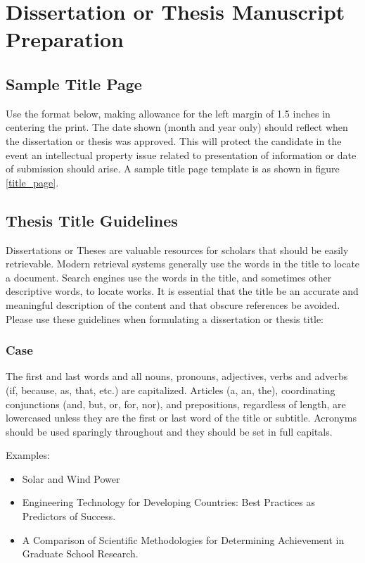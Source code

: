 

\chapter{Dissertation or Thesis Manuscript Preparation}
\label{chapter2}

\section{Sample Title Page}

Use the format below, making allowance for the left margin of 1.5 inches in centering the print. The date shown (month and year only) should reflect when the dissertation or thesis was approved. This will protect the candidate in the event an intellectual property issue related to presentation of information or date of submission should arise. A sample title page template is as shown in figure \ref{title_page}.

\section{Thesis Title Guidelines}

Dissertations or Theses are valuable resources for scholars that should be easily retrievable. Modern retrieval systems generally use the words in the title to locate a document. Search engines use the words in the title, and sometimes other descriptive words, to locate works. It is essential that the title be an accurate and meaningful description of the content and that obscure references be avoided. Please use these guidelines when formulating a dissertation or thesis title:

\subsection{Case}

The first and last words and all nouns, pronouns, adjectives, verbs and adverbs (if, because, as, that, etc.) are capitalized. Articles (a, an, the), coordinating conjunctions (and, but, or, for, nor), and prepositions, regardless of length, are lowercased unless they are the first or last word of the title or subtitle. Acronyms should be used sparingly throughout and they should be set in full capitals.

Examples:

\begin{itemize}
\item Solar and Wind Power
\item Engineering Technology for Developing Countries: Best Practices as Predictors of Success.
\item A Comparison of Scientific Methodologies for Determining Achievement in Graduate School Research.

\end{itemize}


